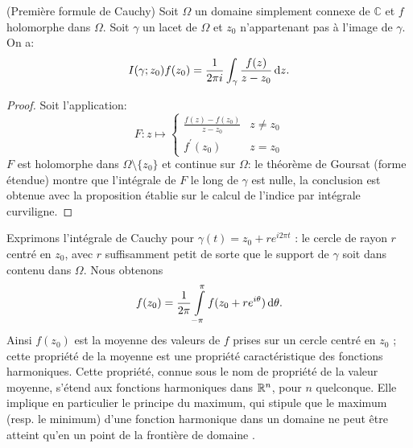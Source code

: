 \begin{fthm}(Première formule de Cauchy)\label{the:formcauchy}
Soit $\Omega$ un domaine simplement connexe de $\mathbb{C}$ et $f$ holomorphe
dans $\Omega$. Soit $\gamma$ un lacet de $\Omega$ et $z_0$ n'appartenant pas à
l'image de $\gamma$. On a:
\[
I(\gamma; z_0)f(z_0) = \frac{1}{2 \pi i}\int_{\gamma} \frac{f(z)}{z-z_0} \mathop{}\mathopen{}\mathrm{d} z.
\]
\end{fthm}
\begin{proof}
Soit l'application:
\[
F \colon z \mapsto \left \{
\begin{array}{cc} 
\frac{f(z)-f(z_0)}{z-z_0} & z \neq z_0 \\
f^\prime(z_0) & z = z_0
\end{array}
\right.
\]
$F$ est holomorphe dans $\Omega \setminus \{z_0\}$ et continue sur $\Omega$: le théorème
de Goursat (forme étendue) montre que l'intégrale de $F$ le long de $\gamma$ est
nulle, la conclusion est obtenue avec la proposition établie sur le calcul de
l'indice par intégrale curviligne.
\end{proof}


 

\begin{rem} Exprimons l'intégrale de Cauchy pour $\gamma(t)=z_0 + r e^{i 2 \pi t}$ : le cercle de rayon $r$ centré en $z_0$, avec $r$ suffisamment petit de sorte que le support de $\gamma$ soit dans contenu dans $\Omega$. Nous obtenons  
\[f(z_0) = \frac{1}{2 \pi} \int\limits_{-\pi}^\pi f(z_0 + r e^{i \theta}) \mathop{}\mathopen{}\mathrm{d} \theta.\]
Ainsi $f(z_0)$ est la moyenne des valeurs de $f$ prises sur un cercle centré en $z_0$ ; cette propriété de la moyenne est une propriété caractéristique des fonctions harmoniques. Cette propriété, connue sous le nom de propriété de la valeur moyenne, s'étend aux fonctions harmoniques dans $\mathbb R^n$, pour $n$ quelconque. Elle implique en particulier le principe du maximum, qui stipule que le maximum (resp. le minimum) d'une fonction harmonique dans un domaine ne peut être atteint qu'en un point de la frontière de domaine \cite{axler2013harmonic}. 
\end{rem}

